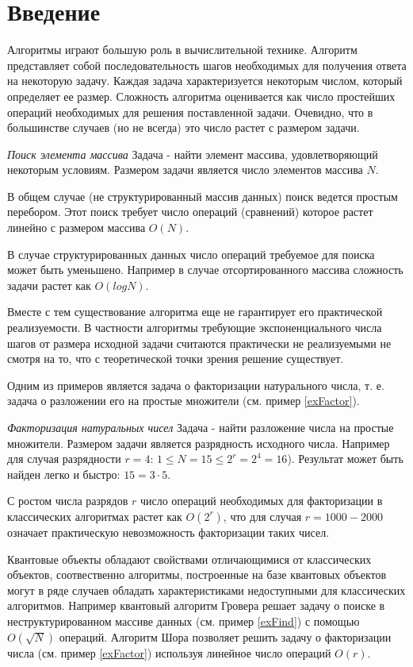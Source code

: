 \section{Введение}
Алгоритмы играют большую роль в вычислительной технике. Алгоритм
представляет собой последовательность шагов необходимых для получения
ответа на некоторую задачу. Каждая задача характеризуется некоторым
числом, который определяет ее размер. Сложность алгоритма оценивается
как число 
простейших операций необходимых для решения поставленной
задачи. Очевидно, что в большинстве случаев (но не всегда) это число
растет с размером задачи. 

\begin{example}
\emph{Поиск элемента массива}
\label{exFind}
Задача - найти элемент массива, удовлетворяющий некоторым
условиям. Размером задачи является число элементов массива $N$. 

В общем случае (не структурированный массив данных) поиск ведется
простым перебором. Этот поиск требует число операций (сравнений) которое
растет линейно с размером массива $O\left( N \right)$.

В случае структурированных данных число операций требуемое для поиска
может быть уменьшено. Например в случае отсортированного массива
сложность задачи растет как $O\left(log N\right)$.
\end{example}

Вместе с тем существование алгоритма еще
не гарантирует его практической реализуемости. В частности алгоритмы
требующие экспоненциального числа шагов от размера исходной задачи
считаются практически не реализуемыми не смотря на то, что с
теоретической точки зрения решение существует.

Одним из примеров является задача о факторизации натурального числа,
т. е. задача о разложении его на простые множители (см. пример
\ref{exFactor}).  

\begin{example}
\emph{Факторизация натуральных чисел}
\label{exFactor}
Задача - найти разложение числа на простые множители.
Размером задачи
является разрядность исходного числа. Например для случая разрядности
$r = 4$: $1 \le N = 15 \le 2^r = 2^4 = 16$). Результат может быть
найден легко и быстро: $15 = 3 \cdot 5$. 

С ростом числа разрядов $r$ число операций необходимых для
факторизации в классических алгоритмах растет как
$O\left(2^r\right)$, что для случая $r = 1000 - 2000$ означает практическую
невозможность факторизации таких чисел. 
\end{example}

Квантовые объекты обладают свойствами отличающимися от классических
объектов, соотвественно алгоритмы, построенные на базе квантовых
объектов могут в ряде случаев обладать характеристиками недоступными
для классических алгоритмов. Например квантовый алгоритм Гровера
\cite{Grover96afast} решает задачу о поиске в неструктурированном
массиве данных (см. пример \ref{exFind}) с помощью
$O\left(\sqrt{N}\right)$ операций. Алгоритм Шора \cite{bShor94}
позволяет решить задачу о факторизации числа (см. пример
\ref{exFactor}) используя линейное число операций $O\left(r\right)$. 

